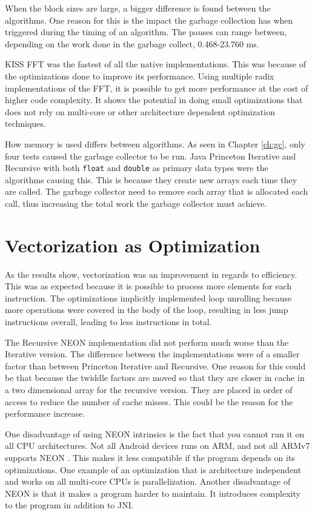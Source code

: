 When the block sizes are large, a bigger difference is found between the algorithms. One reason for this is the impact the garbage collection has when triggered during the timing of an algorithm. The pauses can range between, depending on the work done in the garbage collect, 0.468-23.760 ms.

KISS FFT was the fastest of all the native implementations. This was because of the optimizations done to improve its performance. Using multiple radix implementations of the FFT, it is possible to get more performance at the cost of higher code complexity. It shows the potential in doing small optimizations that does not rely on multi-core or other architecture dependent optimization techniques.

How memory is used differs between algorithms. As seen in Chapter \ref{ch:gc}, only four tests caused the garbage collector to be run. Java Princeton Iterative and Recursive with both \texttt{float} and \texttt{double} as primary data types were the algorithms causing this. This is because they create new arrays each time they are called. The garbage collector need to remove each array that is allocated each call, thus increasing the total work the garbage collector must achieve.

\section{Vectorization as Optimization}

As the results show, vectorization was an improvement in regards to efficiency. This was as expected because it is possible to process more elements for each instruction. The optimizations implicitly implemented loop unrolling because more operations were covered in the body of the loop, resulting in less jump instructions overall, leading to less instructions in total.

The Recursive NEON implementation did not perform much worse than the Iterative version. The difference between the implementations were of a smaller factor than between Princeton Iterative and Recursive. One reason for this could be that because the twiddle factors are moved so that they are closer in cache in a two dimensional array for the recursive version. They are placed in order of access to reduce the number of cache misses. This could be the reason for the performance increase.


One disadvantage of using NEON intrinsics is the fact that you cannot run it on all CPU architectures. Not all Android devices runs on ARM, and not all ARMv7 supports NEON \cite{arm:neon}. This makes it less compatible if the program depends on its optimizations. One example of an optimization that is architecture independent and works on all multi-core CPUs is parallelization. Another disadvantage of NEON is that it makes a program harder to maintain. It introduces complexity to the program in addition to JNI. 

